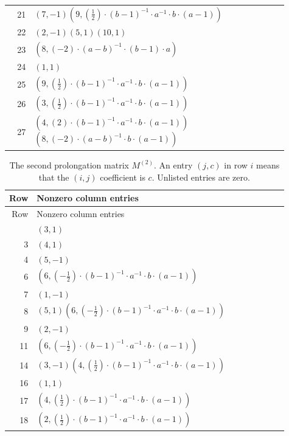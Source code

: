 \begin{longtable}{@{}r>{\raggedright\arraybackslash}p{0.91\linewidth}@{}}
21 & \((7,-1)\)\allowbreak\quad \((9,\left(\frac{1}{2}\right) \cdot (b - 1)^{-1} \cdot a^{-1} \cdot b \cdot (a - 1))\)\\
22 & \((2,-1)\)\allowbreak\quad \((5,1)\)\allowbreak\quad \((10,1)\)\\
23 & \((8,\left(-2\right) \cdot (a - b)^{-1} \cdot (b - 1) \cdot a)\)\\
24 & \((1,1)\)\\
25 & \((9,\left(\frac{1}{2}\right) \cdot (b - 1)^{-1} \cdot a^{-1} \cdot b \cdot (a - 1))\)\\
26 & \((3,\left(\frac{1}{2}\right) \cdot (b - 1)^{-1} \cdot a^{-1} \cdot b \cdot (a - 1))\)\\
27 & \((4,\left(2\right) \cdot (b - 1)^{-1} \cdot a^{-1} \cdot b \cdot (a - 1))\)\allowbreak\quad \((8,\left(-2\right) \cdot (a - b)^{-1} \cdot b \cdot (a - 1))\)\\
\end{longtable}
\endgroup

\begingroup\small
\setlength{\tabcolsep}{3pt}
\renewcommand{\arraystretch}{1.16}
\begin{longtable}{@{}r>{\raggedright\arraybackslash}p{0.91\linewidth}@{}}
\caption{The second prolongation matrix $M^{(2)}$. An entry $(j,c)$ in row $i$ means that the $(i,j)$ coefficient is $c$. Unlisted entries are zero.}\label{supp:matrix-M2}\\
\toprule Row & Nonzero column entries\\\midrule\endfirsthead
\toprule Row & Nonzero column entries\\\midrule\endhead
\bottomrule\endfoot
1 & \((3,1)\)\\
3 & \((4,1)\)\\
4 & \((5,-1)\)\\
6 & \((6,\left(-\frac{1}{2}\right) \cdot (b - 1)^{-1} \cdot a^{-1} \cdot b \cdot (a - 1))\)\\
7 & \((1,-1)\)\\
8 & \((5,1)\)\allowbreak\quad \((6,\left(-\frac{1}{2}\right) \cdot (b - 1)^{-1} \cdot a^{-1} \cdot b \cdot (a - 1))\)\\
9 & \((2,-1)\)\\
11 & \((6,\left(-\frac{1}{2}\right) \cdot (b - 1)^{-1} \cdot a^{-1} \cdot b \cdot (a - 1))\)\\
14 & \((3,-1)\)\allowbreak\quad \((4,\left(\frac{1}{2}\right) \cdot (b - 1)^{-1} \cdot a^{-1} \cdot b \cdot (a - 1))\)\\
16 & \((1,1)\)\\
17 & \((4,\left(\frac{1}{2}\right) \cdot (b - 1)^{-1} \cdot a^{-1} \cdot b \cdot (a - 1))\)\\
18 & \((2,\left(\frac{1}{2}\right) \cdot (b - 1)^{-1} \cdot a^{-1} \cdot b \cdot (a - 1))\)\\
\end{longtable}
\endgroup

